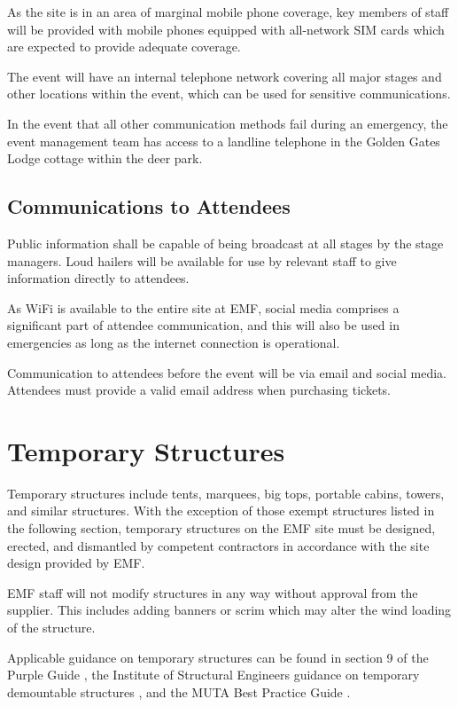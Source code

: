 As the site is in an area of marginal mobile phone coverage, key members of staff
will be provided with mobile phones equipped with all-network SIM cards which
are expected to provide adequate coverage.

The event will have an internal telephone network covering all major stages and
other locations within the event, which can be used for sensitive
communications.

In the event that all other communication methods fail during an emergency, the
event management team has access to a landline telephone in the Golden Gates
Lodge cottage within the deer park.

\subsection{Communications to Attendees}\label{attendeecomms}
Public information shall be capable of being broadcast at all stages by the
stage managers. Loud hailers will be available for use by relevant staff to
give information directly to attendees.

As WiFi is available to the entire site at EMF, social media comprises a
significant part of attendee communication, and this will also be used in
emergencies as long as the internet connection is operational.

Communication to attendees before the event will be via email and social
media. Attendees must provide a valid email address when purchasing tickets.

\section{Temporary Structures}
Temporary structures include tents, marquees, big tops, portable cabins,
towers, and similar structures. With the exception of those exempt structures
listed in the following section, temporary structures on the EMF site must
be designed, erected, and dismantled by competent contractors in accordance
with the site design provided by EMF.

EMF staff will not modify structures in any way without approval from the supplier.
This includes adding banners or scrim which may alter the wind loading of the
structure.

Applicable guidance on temporary structures can be found in
section 9 of the Purple Guide \cite{purpleguide}, the Institute of Structural
Engineers guidance on temporary demountable structures \cite{istructe-tds}, and
the MUTA Best Practice Guide \cite{mutaguide}.

